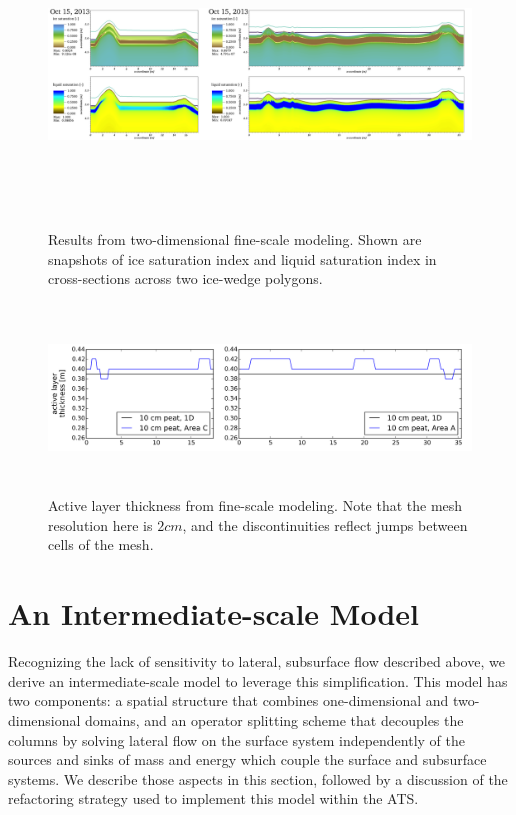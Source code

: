 \documentclass[review]{elsarticle}
\begin{document}
\begin{figure}
\centering
\includegraphics[height=8cm,width=17cm]{figures/FineScaleOct15.png}
\caption{Results from two-dimensional fine-scale modeling. Shown are snapshots of ice saturation index and liquid saturation index in cross-sections across two ice-wedge polygons.}
\label{oct15}
\end{figure}

\begin{figure}[!htpb]
\centering
\includegraphics[height=5cm, width=12cm]{figures/ALT-finescale.png}
\caption{Active layer thickness from fine-scale modeling.  Note that the mesh resolution here is $2 cm$, and the discontinuities reflect jumps between cells of the mesh.}
\label{alt}
\end{figure}


\section{An Intermediate-scale Model}\label{mixed-dim-model}
Recognizing the lack of sensitivity to lateral, subsurface flow described above, we derive an intermediate-scale model to leverage this simplification.
This model has two components: a spatial structure that combines one-dimensional and two-dimensional domains, and an operator splitting scheme that decouples the columns by solving lateral flow on the surface system independently of the sources and sinks of mass and energy which couple the surface and subsurface systems.
We describe those aspects in this section, followed by a discussion of the refactoring strategy used to implement this model within the ATS.
\end{document}
